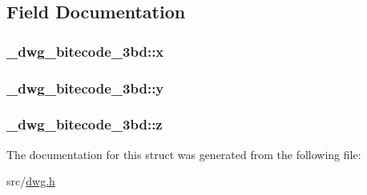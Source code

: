 \subsection{\-Field \-Documentation}
\hypertarget{struct__dwg__bitecode__3bd_a54541117d7c055dc45e4b1811f7f31e4}{
\subsubsection[{x}]{ {\bf \-\_\-dwg\-\_\-bitecode\-\_\-3bd\-::x}}}\label{struct__dwg__bitecode__3bd_a54541117d7c055dc45e4b1811f7f31e4}
\hypertarget{struct__dwg__bitecode__3bd_af330c857c71800de5caf39745f45fb36}{
\subsubsection[{y}]{ {\bf \-\_\-dwg\-\_\-bitecode\-\_\-3bd\-::y}}}\label{struct__dwg__bitecode__3bd_af330c857c71800de5caf39745f45fb36}
\hypertarget{struct__dwg__bitecode__3bd_a3d4c8a20b5affeda73d8bc647fa2600b}{
\subsubsection[{z}]{ {\bf \-\_\-dwg\-\_\-bitecode\-\_\-3bd\-::z}}}\label{struct__dwg__bitecode__3bd_a3d4c8a20b5affeda73d8bc647fa2600b}


\-The documentation for this struct was generated from the following file\-:\begin{DoxyCompactItemize}
\item 
src/\hyperlink{dwg_8h}{dwg.\-h}\end{DoxyCompactItemize}
